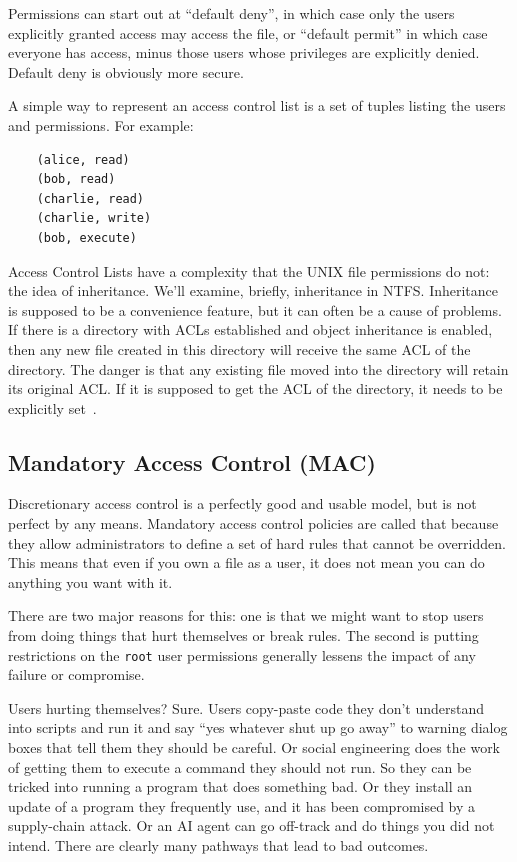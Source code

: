Permissions can start out at ``default deny'', in which case only the users explicitly granted access may access the file, or ``default permit'' in which case everyone has access, minus those users whose privileges are explicitly denied. Default deny is obviously more secure.

A simple way to represent an access control list is a set of tuples listing the users and permissions. For example:
\begin{lstlisting}
	(alice, read)
	(bob, read)
	(charlie, read)
	(charlie, write)
	(bob, execute)
\end{lstlisting}

Access Control Lists have a complexity that the UNIX file permissions do not: the idea of inheritance. We'll examine, briefly, inheritance in NTFS. Inheritance is supposed to be a convenience feature, but it can often be a cause of problems. If there is a directory with ACLs established and object inheritance is enabled, then any new file created in this directory will receive the same ACL of the directory. The danger is that any existing file moved into the directory will retain its original ACL. If it is supposed to get the ACL of the directory, it needs to be explicitly set~\cite{ntfsacl}.

\subsection*{Mandatory Access Control (MAC)}

Discretionary access control is a perfectly good and usable model, but is not perfect by any means. Mandatory access control policies are called that because they allow administrators to define a set of hard rules that cannot be overridden. This means that even if you own a file as a user, it does not mean you can do anything you want with it. 

There are two major reasons for this: one is that we might want to stop users from doing things that hurt themselves or break rules. The second is putting restrictions on the \texttt{root} user permissions generally lessens the impact of any failure or compromise.

Users hurting themselves? Sure. Users copy-paste code they don't understand into scripts and run it and say ``yes whatever shut up go away'' to warning dialog boxes that tell them they should be careful. Or social engineering does the work of getting them to execute a command they should not run. So they can be tricked into running a program that does something bad. Or they install an update of a program they frequently use, and it has been compromised by a supply-chain attack. Or an AI agent can go off-track and do things you did not intend. There are clearly many pathways that lead to bad outcomes.

